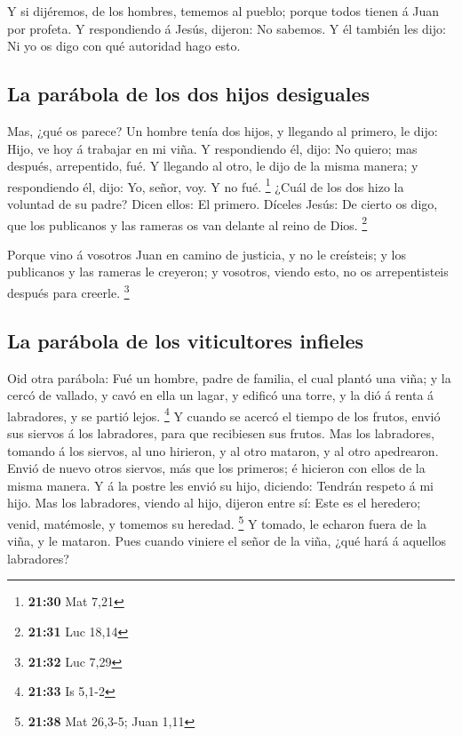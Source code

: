  Y si dijéremos, de los hombres, tememos al pueblo;
porque todos tienen á Juan por profeta.  Y respondiendo á
Jesús, dijeron: No sabemos. Y él también les dijo: Ni yo os digo con qué
autoridad hago esto.

\hypertarget{la-paruxe1bola-de-los-dos-hijos-desiguales}{%
\subsection{La parábola de los dos hijos
desiguales}\label{la-paruxe1bola-de-los-dos-hijos-desiguales}}

 Mas, ¿qué os parece? Un hombre tenía dos hijos, y
llegando al primero, le dijo: Hijo, ve hoy á trabajar en mi viña.
 Y respondiendo él, dijo: No quiero; mas después,
arrepentido, fué.  Y llegando al otro, le dijo de la
misma manera; y respondiendo él, dijo: Yo, señor, voy. Y no fué.
\footnote{\textbf{21:30} Mat 7,21}  ¿Cuál de los dos hizo
la voluntad de su padre? Dicen ellos: El primero. Díceles Jesús: De
cierto os digo, que los publicanos y las rameras os van delante al reino
de Dios. \footnote{\textbf{21:31} Luc 18,14}

 Porque vino á vosotros Juan en camino de justicia, y no
le creísteis; y los publicanos y las rameras le creyeron; y vosotros,
viendo esto, no os arrepentisteis después para creerle. \footnote{\textbf{21:32}
  Luc 7,29}

\hypertarget{la-paruxe1bola-de-los-viticultores-infieles}{%
\subsection{La parábola de los viticultores
infieles}\label{la-paruxe1bola-de-los-viticultores-infieles}}

 Oid otra parábola: Fué un hombre, padre de familia, el
cual plantó una viña; y la cercó de vallado, y cavó en ella un lagar, y
edificó una torre, y la dió á renta á labradores, y se partió lejos.
\footnote{\textbf{21:33} Is 5,1-2}  Y cuando se acercó el
tiempo de los frutos, envió sus siervos á los labradores, para que
recibiesen sus frutos.  Mas los labradores, tomando á los
siervos, al uno hirieron, y al otro mataron, y al otro apedrearon.
 Envió de nuevo otros siervos, más que los primeros; é
hicieron con ellos de la misma manera.  Y á la postre les
envió su hijo, diciendo: Tendrán respeto á mi hijo.  Mas
los labradores, viendo al hijo, dijeron entre sí: Este es el heredero;
venid, matémosle, y tomemos su heredad. \footnote{\textbf{21:38} Mat
  26,3-5; Juan 1,11}  Y tomado, le echaron fuera de la
viña, y le mataron.  Pues cuando viniere el señor de la
viña, ¿qué hará á aquellos labradores?

